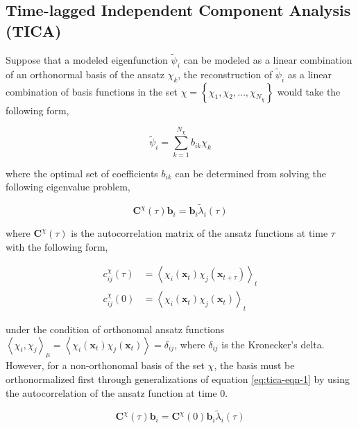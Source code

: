 \begin{spacing}{2.0}
    \subsection{Time-lagged Independent Component Analysis (TICA)}\label{ssec:tica}

    Suppose that a modeled eigenfunction $\tilde{\psi}_i$ can be modeled as a linear combination of an orthonormal basis of the ansatz $\chi_k$,
    the reconstruction of $\tilde{\psi}_i$ as a linear combination of basis functions in the set $\chi = \left\{\chi_1,\chi_2,\ldots,\chi_{N_{\chi}}\right\}$
    would take the following form,

    \begin{equation}
        \tilde{\psi}_i = \sum_{k=1}^{N_{\chi}} b_{ik}\chi_k
    \end{equation}

    \noindent where the optimal set of coefficients $b_{ik}$ can be determined from solving the following eigenvalue problem,

    \begin{equation}
        \mathbf{C}^{\chi}(\tau)\mathbf{b}_i = \mathbf{b}_i\tilde{\lambda}_i(\tau)
        \label{eq:tica-eqn-1}
    \end{equation}

    \noindent where $\mathbf{C}^{\chi}(\tau)$ is the autocorrelation matrix of the ansatz functions at time $\tau$ with the following form,

    \begin{equation}\begin{aligned}
        c_{ij}^{\chi}(\tau) &= \left<\chi_i(\mathbf{x}_t)\chi_j(\mathbf{x}_{t+\tau})\right>_t \\
        c_{ij}^{\chi}(0) &= \left<\chi_i(\mathbf{x}_t)\chi_j(\mathbf{x}_{t})\right>_t
    \end{aligned}\end{equation}

    \noindent under the condition of orthonomal ansatz functions $\left<\chi_i,\chi_j\right>_{\mu} = \left<\chi_i(\mathbf{x}_t)
    \chi_j(\mathbf{x}_t)\right> = \delta_{ij}$, where $\delta_{ij}$ is the Kronecker's delta. However, for a non-orthonomal basis of the set $\chi$,
    the basis must be orthonormalized first through generalizations of equation \ref{eq:tica-eqn-1} by using the autocorrelation of the ansatz 
    function at time 0.

    \begin{equation}
        \mathbf{C}^{\chi}(\tau)\mathbf{b}_i = \mathbf{C}^{\chi}(0)\mathbf{b}_i\tilde{\lambda}_i(\tau)
        \label{eq:tica-eqn-2}
    \end{equation}


\end{spacing}
